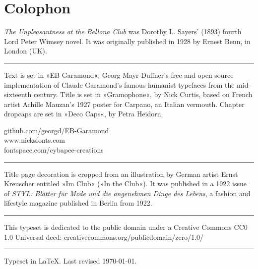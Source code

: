 \documentclass[
paper=5.5in:8.5in,
]{scrbook} %
\begin{document}
\chapter*{Colophon}
\begin{center}
\begin{minipage}{\textwidth}
\textit{The Unpleasantness at the Bellona Club} was Dorothy L. Sayers' (1893) fourth Lord Peter Wimsey novel. It was originally published in 1928 by Ernest Benn, in London (UK).
\end{minipage}
\vfill
\rule{0.5\textwidth}{.4pt}
\vfill
\begin{minipage}{\textwidth}
Text is set in »EB Garamond«, Georg Mayr-Duffner's free and open source implementation of Claude Garamond’s famous humanist typefaces from the mid-sixteenth century. Title is set in »Gramophone«, by Nick Curtis, based on French artist Achille Mauzan’s 1927 poster for Carpano, an Italian vermouth. Chapter dropcaps are set in »Deco Caps«, by Petra Heidorn.
\end{minipage}
\vfill
github.com/georgd/EB-Garamond\\www.nicksfonts.com\\fontspace.com/cybapee-creations
\vfill
\rule{0.5\textwidth}{.4pt}
\vfill
\begin{minipage}{\textwidth}
Title page decoration is cropped from an illustration by German artist Ernst Kreuscher entitled »Im Club« (»In the Club«). It was published in a 1922 issue of \textit{STYL: Blätter für Mode und die angenehmen Dinge des Lebens}, a fashion and lifestyle magazine published in Berlin from 1922.
\end{minipage}
\vfill
\rule{0.5\textwidth}{.4pt}
\vfill
\begin{minipage}{\textwidth}
This typeset is dedicated to the public domain under a Creative Commons CC0 1.0 Universal deed: creativecommons.org/publicdomain/zero/1.0/
\end{minipage}
\vfill
\rule{0.5\textwidth}{.4pt}
\vfill
Typeset in \LaTeX{}. Last revised \today.
\end{center}
\thispagestyle{empty}
\end{document}
